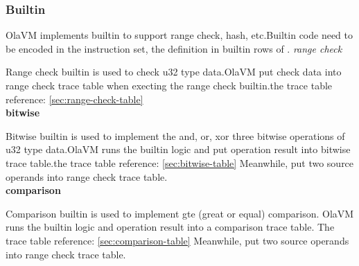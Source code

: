 \subsubsection{Builtin}\label{subsec: instructions-builtin}
OlaVM implements builtin to support range check, hash, etc.Builtin code need to be encoded in the instruction set, the definition in builtin rows of .
\emph{range check}

Range check builtin is used to check u32 type data.OlaVM put check data into range check trace table when execting the range check builtin.the trace table reference: \ref{sec:range-check-table} \\
\textbf{bitwise}

Bitwise builtin is used to implement the and, or, xor three bitwise operations of u32 type data.OlaVM runs the builtin logic and put operation result into bitwise trace table.the trace table reference: \ref{sec:bitwise-table}
Meanwhile, put two source operands into range check trace table. \\
\textbf{comparison}

Comparison builtin is used to implement gte (great or equal) comparison. OlaVM runs the builtin logic and operation result into a comparison trace table. The trace table reference: \ref{sec:comparison-table}
Meanwhile, put two source operands into range check trace table.
